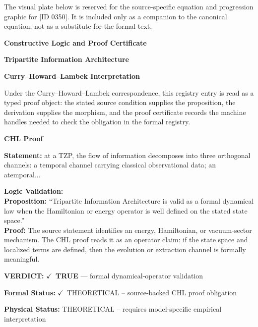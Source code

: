\begingroup\footnotesize\sloppy
The visual plate below is reserved for the source-specific equation and progression graphic for [ID 0350]. It is included only as a companion to the canonical equation, not as a substitute for the formal text.
\par\endgroup
\ifTZPDarkEdition
{}
\fi

\clearpage
\begingroup\tzpsupportsetup
\noindent\textbf{\fontsize{10.8pt}{12.8pt}\selectfont [ID 0350] Constructive Logic and Proof Certificate}\par
\noindent\textbf{\fontsize{10pt}{12pt}\selectfont Tripartite Information Architecture}\par
\vspace{0.45em}
\begingroup
\footnotesize
\setlength{\parskip}{0.22em}
\setlength{\parindent}{0pt}
\noindent\textbf{Curry--Howard--Lambek Interpretation}\par
Under the Curry--Howard--Lambek correspondence, this registry entry is read as a typed proof
object: the stated source condition supplies the proposition, the derivation supplies the
morphism, and the proof certificate records the machine handles needed to check the obligation
in the formal registry.

\vspace{0.45em}
\noindent\textbf{CHL Proof}\par
\textbf{Statement:} at a TZP, the flow of information decomposes into three orthogonal channels: a temporal
channel carrying classical observational data; an atemporal...

\textbf{Logic Validation:}\\
\textbf{Proposition:} ``Tripartite Information Architecture is valid as a formal dynamical law when the
Hamiltonian or energy operator is well defined on the stated state space.''\\
\textbf{Proof:} The source statement identifies an energy, Hamiltonian, or vacuum-sector mechanism. The
CHL proof reads it as an operator claim: if the state space and localized terms are
defined, then the evolution or extraction channel is formally meaningful.

\textbf{VERDICT:} \ensuremath{\checkmark}\ \textbf{TRUE} --- formal dynamical-operator validation

\textbf{Formal Status:} \ensuremath{\checkmark}\ THEORETICAL -- source-backed CHL proof obligation

\textbf{Physical Status:} THEORETICAL -- requires model-specific empirical interpretation
\par\vspace{0.45em}
\par
\ifTZPDarkEdition
{}
\fi
\endgroup
\endgroup
